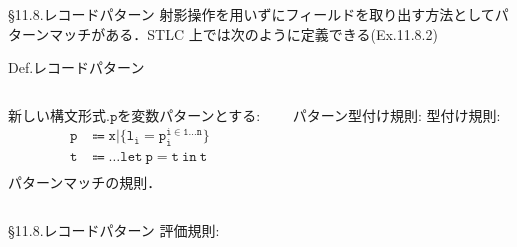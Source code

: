 \documentclass[9pt]{beamer}
\begin{document}
\begin{frame}{\S11.8.レコードパターン}
射影操作を用いずにフィールドを取り出す方法としてパターンマッチがある．STLC 上では次のように定義できる(Ex.11.8.2)
\begin{alertblock}{Def.レコードパターン}
\begin{columns}
\begin{column}{0.5\columnwidth}
新しい構文形式.$\mathtt{p}$を変数パターンとする:\begin{align*}
\mathtt{p}&\Coloneq \mathtt{x|\{l_{i}=p_{i}^{{i\in1\ldots n}}\}}\\
\mathtt{t}&\Coloneq\ldots\mathtt{let\ p=t\ in\ t}\\
\end{align*}
パターンマッチの規則．
\end{column}
\begin{column}{0.5\columnwidth}
パターン型付け規則:
型付け規則:
\end{column}
\end{columns}
\end{alertblock}
\end{frame}
\begin{frame}{\S11.8.レコードパターン}
評価規則:
\end{frame}
\end{document}
